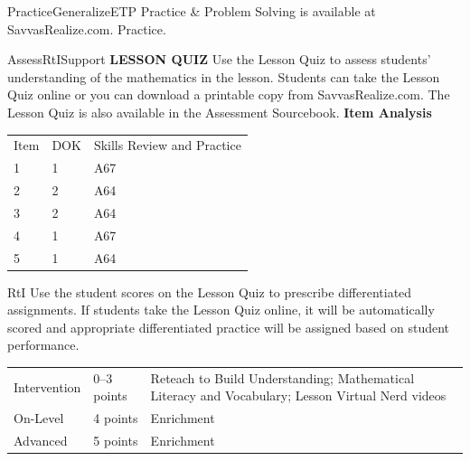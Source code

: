\documentclass{article}
\newenvironment{te-addendum}[2]{}{}     %
\begin{document}
\begin{te-addendum}{Practice}{GeneralizeETP}
Practice \& Problem Solving is available at SavvasRealize.com. Practice.
\end{te-addendum}
\begin{te-addendum}{Assess}{RtISupport}
\textbf{LESSON QUIZ}
Use the Lesson Quiz to assess students' understanding of the mathematics in the lesson.
Students can take the Lesson Quiz online or you can download a printable copy from SavvasRealize.com. The Lesson Quiz is also available in the Assessment Sourcebook.
\textbf{Item Analysis}
\begin{tabular}{lll}
Item & DOK & Skills Review and Practice \\
1 & 1 & A67 \\
2 & 2 & A64 \\
3 & 2 & A64 \\
4 & 1 & A67 \\
5 & 1 & A64 \\
\end{tabular}
RtI Use the student scores on the Lesson Quiz to prescribe differentiated assignments.
If students take the Lesson Quiz online, it will be automatically scored and appropriate differentiated practice will be assigned based on student performance.
\begin{tabular}{lll}
Intervention & 0--3 points & Reteach to Build Understanding; Mathematical Literacy and Vocabulary; Lesson Virtual Nerd videos \\
On-Level & 4 points & Enrichment \\
Advanced & 5 points & Enrichment \\
\end{tabular}
\end{te-addendum}
\end{document}

